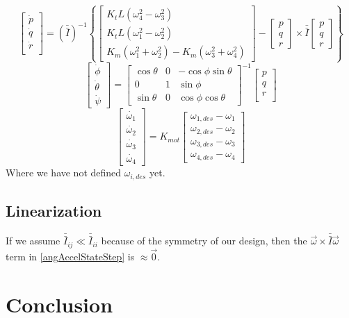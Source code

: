 \documentclass{article}
\numberwithin{equation}{section}
\newcommand{\omegaVec}{
\left[ \begin{array}{ccc}
p\\
q\\
r \end{array} \right]
}
\begin{document}
\begin{equation}
\label{angAccelStateStep}
\left[\begin{array}{c}\dot{p}\\
			       \dot{q}\\
			       \dot{r} \\ \end{array} \right]
			       =
 	 \left(\bar{\bar{I}}\right)^{-1}\left\{
	  \left[ \begin{array}{ccc} K_{t}L\left(\omega_4^2 - \omega_3^2\right) \\ 
  				      K_{t}L\left(\omega_1^2 - \omega_2^2\right) \\ 
				      K_{m}\left(\omega_1^2 + \omega_2^2\right) - K_{m}\left(\omega_3^2 +\omega_4^2\right) \end{array} \right]
				      -
				      \omegaVec \times \bar{\bar{I}} \omegaVec \right\}
\end{equation}
\begin{equation}
\label{eulerDotStateStep}
\left[\begin{array}{c}\dot{\phi}\\
				\dot{\theta} \\
				\dot{\psi} \end{array} \right]
				=
		\left[ \begin{array}{ccc} \cos{\theta} & 0 & -\cos{\phi}\sin{\theta} \\
						     0 & 1 & \sin{\phi} \\
						     \sin{\theta} & 0 & \cos{\phi}\cos{\theta} \end{array} \right]^{-1}
		\left[\begin{array}{c}p\\
			       q\\
			       r \\ \end{array} \right]
\end{equation}
\begin{equation}
\label{omegaDotStateStep}
\left[\begin{array}{c} \dot{\omega_1} \\
				\dot{\omega_2} \\
				\dot{\omega_3} \\
				\dot{\omega_4} \end{array} \right]
				=
	K_{mot}\left[\begin{array}{c} \omega_{1,des} - \omega_1 \\
						   \omega_{2,des} - \omega_2 \\
						   \omega_{3,des} - \omega_3 \\
						   \omega_{4,des} - \omega_4 \end{array} \right]
\end{equation}
Where we have not defined $\omega_{i,des}$ yet.

\subsection{Linearization}
If we assume $\bar{\bar{I}}_{ij} \ll \bar{\bar{I}}_{ii}$ because of the symmetry of our design, then the $\vec{\omega} \times \bar{\bar{I}}\vec{\omega} $ term in \eqref{angAccelStateStep} is $\approx \vec{0}$.  

  \section{Conclusion}
\end{document}
